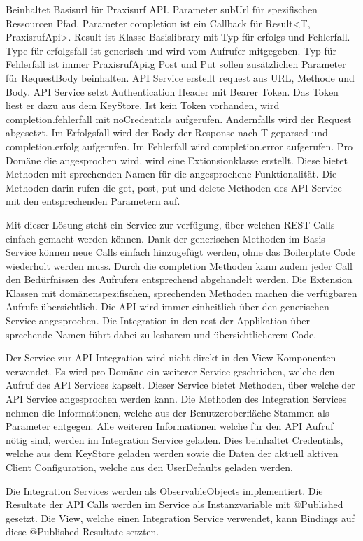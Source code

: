 Beinhaltet Basisurl für Praxisurf API.
Parameter subUrl für spezifischen Ressourcen Pfad.
Parameter completion ist ein Callback für Result<T, PraxisrufApi>.
Result ist Klasse Basislibrary mit Typ für erfolgs und Fehlerfall.
Type für erfolgsfall ist generisch und wird vom Aufrufer mitgegeben.
Typ für Fehlerfall ist immer PraxisrufApi.g
Post und Put sollen zusätzlichen Parameter für RequestBody beinhalten.
API Service erstellt request aus URL, Methode und Body.
API Service setzt Authentication Header mit Bearer Token.
Das Token liest er dazu aus dem KeyStore.
Ist kein Token vorhanden, wird completion.fehlerfall mit noCredentials aufgerufen.
Andernfalls wird der Request abgesetzt.
Im Erfolgsfall wird der Body der Response nach T geparsed und completion.erfolg aufgerufen.
Im Fehlerfall wird completion.error aufgerufen.
Pro Domäne die angesprochen wird, wird eine Extionsionklasse erstellt.
Diese bietet Methoden mit sprechenden Namen für die angesprochene Funktionalität.
Die Methoden darin rufen die get, post, put und delete Methoden des API Service mit den entsprechenden Parametern auf.

Mit dieser Lösung steht ein Service zur verfügung, über welchen REST Calls einfach gemacht werden können.
Dank der generischen Methoden im Basis Service können neue Calls einfach hinzugefügt werden, ohne das Boilerplate Code wiederholt werden muss.
Durch die completion Methoden kann zudem jeder Call den Bedürfnissen des Aufrufers entsprechend abgehandelt werden.
Die Extension Klassen mit domänenspezifischen, sprechenden Methoden machen die verfügbaren Aufrufe übersichtlich.
Die API wird immer einheitlich über den generischen Service angesprochen.
Die Integration in den rest der Applikation über sprechende Namen führt dabei zu lesbarem und übersichtlicherem Code.

Der Service zur API Integration wird nicht direkt in den View Komponenten verwendet.
Es wird pro Domäne ein weiterer Service geschrieben, welche den Aufruf des API Services kapselt.
Dieser Service bietet Methoden, über welche der API Service angesprochen werden kann.
Die Methoden des Integration Services nehmen die Informationen, welche aus der Benutzeroberfläche Stammen als Parameter entgegen.
Alle weiteren Informationen welche für den API Aufruf nötig sind, werden im Integration Service geladen.
Dies beinhaltet Credentials, welche aus dem KeyStore geladen werden sowie die Daten der aktuell aktiven Client Configuration, welche aus den UserDefaults geladen werden.

Die Integration Services werden als ObservableObjects implementiert.
Die Resultate der API Calls werden im Service als Instanzvariable mit @Published gesetzt.
Die View, welche einen Integration Service verwendet, kann Bindings auf diese @Published Resultate setzten.

